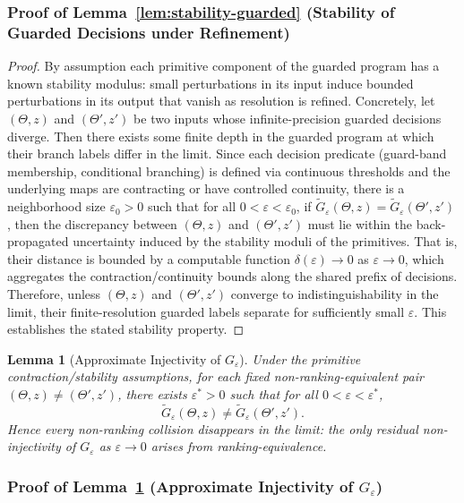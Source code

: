 \documentclass[12pt]{article}
\theoremstyle{definition}
\theoremstyle{plain}
\newtheorem{lemma}{Lemma}[section]
\begin{document}
\subsubsection*{Proof of Lemma~\ref{lem:stability-guarded} (Stability of Guarded Decisions under Refinement)}
\label{proof:stability-guarded}

\begin{proof}
By assumption each primitive component of the guarded program has a known stability modulus: small perturbations in its input induce bounded perturbations in its output that vanish as resolution is refined. Concretely, let \((\Theta,z)\) and \((\Theta',z')\) be two inputs whose infinite-precision guarded decisions diverge. Then there exists some finite depth in the guarded program at which their branch labels differ in the limit. Since each decision predicate (guard-band membership, conditional branching) is defined via continuous thresholds and the underlying maps are contracting or have controlled continuity, there is a neighborhood size \(\varepsilon_0>0\) such that for all \(0<\varepsilon<\varepsilon_0\), if \(\tilde G_\varepsilon(\Theta,z)=\tilde G_\varepsilon(\Theta',z')\), then the discrepancy between \((\Theta,z)\) and \((\Theta',z')\) must lie within the back-propagated uncertainty induced by the stability moduli of the primitives. That is, their distance is bounded by a computable function \(\delta(\varepsilon)\to0\) as \(\varepsilon\to0\), which aggregates the contraction/continuity bounds along the shared prefix of decisions. Therefore, unless \((\Theta,z)\) and \((\Theta',z')\) converge to indistinguishability in the limit, their finite-resolution guarded labels separate for sufficiently small \(\varepsilon\). This establishes the stated stability property.
\end{proof}


\begin{lemma}[Approximate Injectivity of \(G_\varepsilon\)]
\label{lem:approx-injective}
Under the primitive contraction/stability assumptions, for each fixed non-ranking-equivalent pair \((\Theta,z)\neq (\Theta',z')\), there exists \(\varepsilon^*>0\) such that for all \(0<\varepsilon<\varepsilon^*\),
\[
\tilde G_\varepsilon(\Theta,z)\neq \tilde G_\varepsilon(\Theta',z').
\]
Hence every non-ranking collision disappears in the limit: the only residual non-injectivity of \(G_\varepsilon\) as \(\varepsilon\to0\) arises from ranking-equivalence.
\end{lemma}

\subsubsection*{Proof of Lemma~\ref{lem:approx-injective} (Approximate Injectivity of \(G_\varepsilon\))}
\label{proof:approx-injective}
\end{document}
